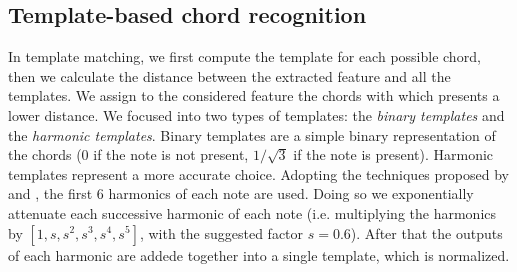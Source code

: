 \subsection{Template-based chord recognition}
\label{subsec:templates}

In template matching, we first compute the template for each possible chord, then we calculate the distance between the extracted feature and all the templates. We assign to the considered feature the chords with which presents a lower distance. We focused into two types of templates: the \textit{binary templates} and the \textit{harmonic templates}. Binary templates are a simple binary representation of the chords (0 if the note is not present, $1/\sqrt{3}$ if the note is present). Harmonic templates represent a more accurate choice. Adopting the techniques proposed by \cite{gomez2006tonal} and \cite{oudre2011chord}, the first 6 harmonics of each note are used. Doing so we exponentially attenuate each successive harmonic of each note (i.e. multiplying the harmonics by $[1, s, s^2, s^3, s^4, s^5]$, with the suggested factor $s=0.6$). After that the outputs of each harmonic are addede together into a single template, which is normalized.
